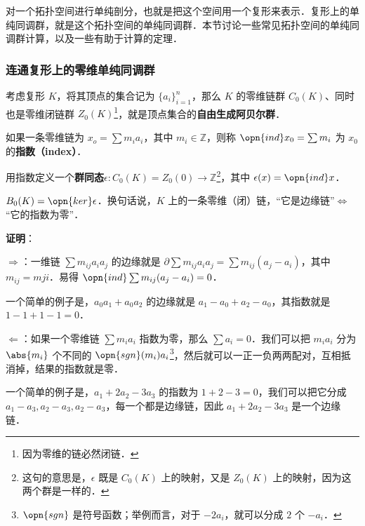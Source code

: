 



对一个拓扑空间进行单纯剖分，也就是把这个空间用一个复形来表示．复形上的单纯同调群，就是这个拓扑空间的单纯同调群．本节讨论一些常见拓扑空间的单纯同调群计算，以及一些有助于计算的定理．

\subsubsection{连通复形上的零维单纯同调群}

考虑复形 $K$，将其顶点的集合记为 $\{a_i\}_{i=1}^n$，那么 $K$ 的零维链群 $C_0(K)$、同时也是零维闭链群 $Z_0(K)$\footnote{因为零维的链必然闭链．}，就是顶点集合的\textbf{自由生成阿贝尔群}．

如果一条零维链为 $x_o=\sum m_ia_i$，其中 $m_i\in\mathbb{Z}$，则称 $\opn{ind} x_0=\sum m_i$ 为 $x_0$ 的\textbf{指数（index）}．

用指数定义一个\textbf{群同态}$\epsilon: C_0(K)=Z_0(0)\to\mathbb{Z}$\footnote{这句的意思是，$\epsilon$ 既是 $C_0(K)$ 上的映射，又是 $Z_0(K)$ 上的映射，因为这两个群是一样的．}，其中 $\epsilon(x)=\opn{ind} x$．

\begin{lemma}{}\label{SHCal_lem1}
$B_0(K)=\opn{ker}\epsilon$．换句话说，$K$ 上的一条零维（闭）链，“它是边缘链”$\iff$“它的指数为零”．
\end{lemma}

\textbf{证明}：

$\Rightarrow$：一维链 $\sum m_{ij}a_ia_j$ 的边缘就是 $\partial\sum m_{ij}a_ia_j=\sum m_{ij}(a_j-a_i)$，其中 $m_{ij}=m{ji}$．易得 $\opn{ind}\sum m_{ij}(a_j-a_i)=0$．

一个简单的例子是，$a_0a_1+a_0a_2$ 的边缘就是 $a_1-a_0+a_2-a_0$，其指数就是 $1-1+1-1=0$．


$\Leftarrow$：如果一个零维链 $\sum m_ia_i$ 指数为零，那么 $\sum a_i=0$．我们可以把 $m_ia_i$ 分为 $\abs{m_i}$ 个不同的 $\opn{sgn}(m_i)a_i$\footnote{$\opn{sgn}$ 是符号函数；举例而言，对于 $-2a_i$，就可以分成 $2$ 个 $-a_i$．}，然后就可以一正一负两两配对，互相抵消掉，结果的指数就是零．

一个简单的例子是，$a_1+2a_2-3a_3$ 的指数为 $1+2-3=0$，我们可以把它分成 $a_1-a_3, a_2-a_3, a_2-a_3$，每一个都是边缘链，因此 $a_1+2a_2-3a_3$ 是一个边缘链．

